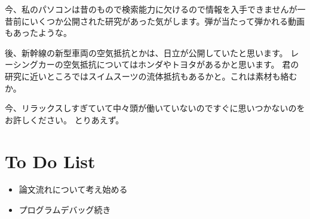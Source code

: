\documentclass[11pt]{jsarticle}
\begin{document}
		今、私のパソコンは昔のもので検索能力に欠けるので情報を入手できませんが一昔前にいくつか公開された研究があった気がします。弾が当たって弾かれる動画もあったような。
		
		後、新幹線の新型車両の空気抵抗とかは、日立が公開していたと思います。
		レーシングカーの空気抵抗についてはホンダやトヨタがあるかと思います。
		君の研究に近いところではスイムスーツの流体抵抗もあるかと。これは素材も絡むか。
		
		今、リラックスしすぎていて中々頭が働いていないのですぐに思いつかないのをお許しください。
		とりあえず。
	\section{To Do List}
		\begin{itemize}
			\item 論文流れについて考え始める
			\item プログラムデバッグ続き
		\end{itemize}
				
	\newpage
\vspace{10cm}
	

\vspace{14cm}
	\articleSPRfour
	\articleSPRfive
\end{document}
